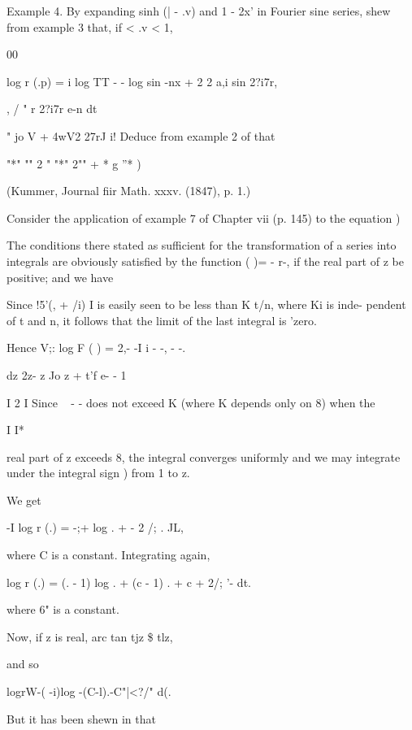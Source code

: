 
Example 4. By expanding sinh (| - .v) and 1 - 2x' in Fourier sine
series, shew from example 3 that, if < .v < 1,

00

log r (.p) = i log TT - - log sin -nx + 2 2 a,i sin 2?i7r,

, / " r 2?i7r e-n dt

" jo V + 4wV2 27rJ i! Deduce from example 2 of  that

"*" "" 2 " "*" 2"" + * g ''* )

(Kummer, Journal fiir Math. xxxv. (1847), p. 1.)


Consider the application of example 7 of Chapter vii (p. 145) to the
equation )

The conditions there stated as sufficient for the transformation of a
series into integrals are obviously satisfied by the function ( )= -
r-, if the real part of z be positive; and we have

Since !5'(, + /i) I is easily seen to be less than K t/n, where Ki is
inde- pendent of t and n, it follows that the limit of the last
integral is 'zero.

Hence V;: log F ( ) = 2,- -I i - -, - -.

dz 2z- z Jo z + t'f e- - 1

I 2 I Since ~ - - does not exceed K (where K depends only on 8) when
the

I I*

real part of z exceeds 8, the integral converges uniformly and we may
integrate under the integral sign ) from 1 to z.

We get

-I log r (.) = -;+ log . + - 2 /; . JL,

where C is a constant. Integrating again,

log r (.) = (. - 1) log . + (c - 1) . + c + 2/; '- dt.

where 6" is a constant.

%
%

Now, if z is real, arc tan tjz \$ tlz,

and so

logrW-( -i)log -(C-l).-C"|<?/" d(.

But it has been shewn in that

